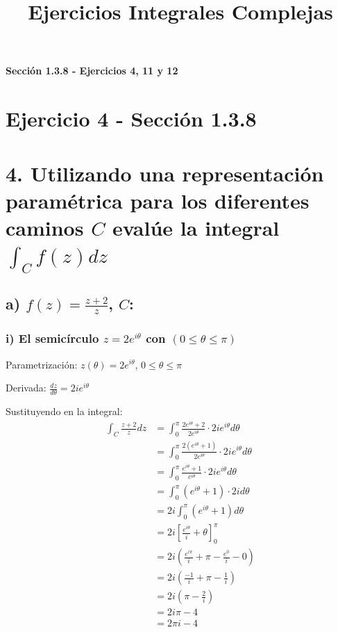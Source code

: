 \documentclass{article}
\title{Ejercicios Integrales Complejas}
\author{}
\date{}
\begin{document}
\maketitle

\begin{center}
\textbf{Sección 1.3.8 - Ejercicios 4, 11 y 12}
\end{center}

\section*{Ejercicio 4 - Sección 1.3.8}

\section*{4. Utilizando una representación paramétrica para los diferentes caminos $C$ evalúe la integral $\int_C f(z) dz$}

\subsection*{a) $f(z) = \frac{z + 2}{z}$, $C$:}

\subsubsection*{i) El semicírculo $z = 2e^{i\theta}$ con $(0 \leq \theta \leq \pi)$}

Parametrización: $z(\theta) = 2e^{i\theta}$, $0 \leq \theta \leq \pi$

Derivada: $\frac{dz}{d\theta} = 2ie^{i\theta}$

Sustituyendo en la integral:
\begin{align*}
\int_C \frac{z + 2}{z} dz &= \int_0^{\pi} \frac{2e^{i\theta} + 2}{2e^{i\theta}} \cdot 2ie^{i\theta} d\theta \\
                          &= \int_0^{\pi} \frac{2(e^{i\theta} + 1)}{2e^{i\theta}} \cdot 2ie^{i\theta} d\theta \\
                          &= \int_0^{\pi} \frac{e^{i\theta} + 1}{e^{i\theta}} \cdot 2ie^{i\theta} d\theta \\
                          &= \int_0^{\pi} (e^{i\theta} + 1) \cdot 2i d\theta \\
                          &= 2i \int_0^{\pi} (e^{i\theta} + 1) d\theta \\
                          &= 2i \left[\frac{e^{i\theta}}{i} + \theta\right]_0^{\pi} \\
                          &= 2i \left(\frac{e^{i\pi}}{i} + \pi - \frac{e^0}{i} - 0\right) \\
                          &= 2i \left(\frac{-1}{i} + \pi - \frac{1}{i}\right) \\
                          &= 2i \left(\pi - \frac{2}{i}\right) \\
                          &= 2i\pi - 4 \\
                          &= 2\pi i - 4
\end{align*}
\end{document}

